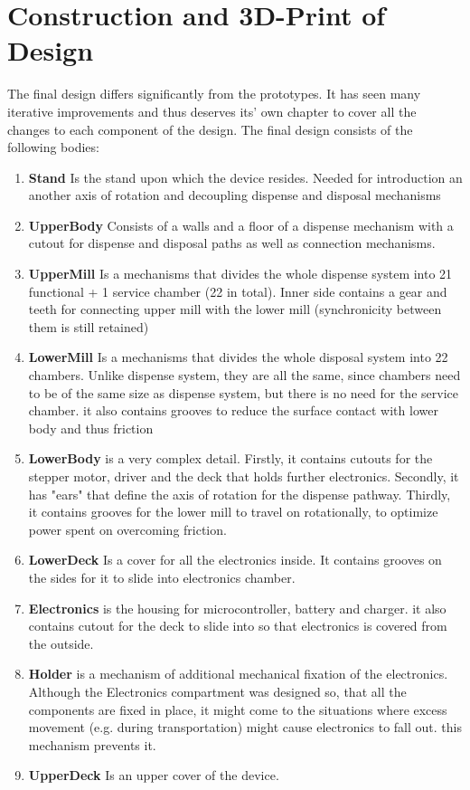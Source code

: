 \section{Construction and 3D-Print of Design}\label{sec:3DPrint}
The final design differs significantly from the prototypes. It has seen many iterative improvements and thus deserves its' own chapter to cover all the changes to each component of the design. The final design consists of the following bodies:
\begin{enumerate}
	\item{\textbf{Stand}} Is the stand upon which the device resides. Needed for introduction an another axis of rotation and decoupling dispense and disposal mechanisms
	\item{\textbf{UpperBody}} Consists of a walls and a floor of a dispense mechanism with a cutout for dispense and disposal paths as well as connection mechanisms.
	\item{\textbf{UpperMill}} Is a mechanisms that divides the whole dispense system into 21 functional + 1 service chamber (22 in total). Inner side contains a gear and teeth for connecting upper mill with the lower mill (synchronicity between them is still retained)
	\item{\textbf{LowerMill}} Is a mechanisms that divides the whole disposal system into 22 chambers. Unlike dispense system, they are all the same, since chambers need to be of the same size as dispense system, but there is no need for the service chamber. it also contains grooves to reduce the surface contact with lower body and thus friction
	\item{\textbf{LowerBody}} is a very complex detail. Firstly, it contains cutouts for the stepper motor, driver and the deck that holds further electronics. Secondly, it has "ears" that define the axis of rotation for the dispense pathway. Thirdly, it contains grooves for the lower mill to travel on rotationally, to optimize power spent on overcoming friction.
	\item{\textbf{LowerDeck}} Is a cover for all the electronics inside. It contains grooves on the sides for it to slide into electronics chamber.
	\item{\textbf{Electronics}} is the housing for microcontroller, battery and charger. it also contains cutout for the deck to slide into so that electronics is covered from the outside.
	\item{\textbf{Holder}} is a mechanism of additional mechanical fixation of the electronics. Although the Electronics compartment was designed so, that all the components are fixed in place, it might come to the situations where excess movement (e.g. during transportation) might cause electronics to fall out. this mechanism prevents it.
	\item{\textbf{UpperDeck}} Is an upper cover of the device.
\end{enumerate}

